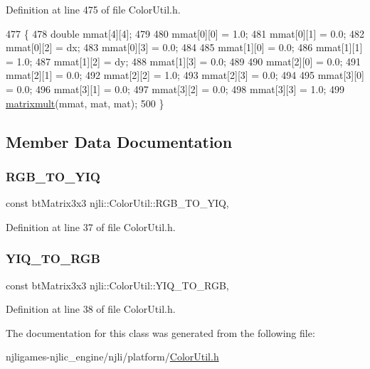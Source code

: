 Definition at line 475 of file Color\+Util.\+h.


\begin{DoxyCode}
477     \{
478       \textcolor{keywordtype}{double} mmat[4][4];
479 
480       mmat[0][0] = 1.0;
481       mmat[0][1] = 0.0;
482       mmat[0][2] = dx;
483       mmat[0][3] = 0.0;
484 
485       mmat[1][0] = 0.0;
486       mmat[1][1] = 1.0;
487       mmat[1][2] = dy;
488       mmat[1][3] = 0.0;
489 
490       mmat[2][0] = 0.0;
491       mmat[2][1] = 0.0;
492       mmat[2][2] = 1.0;
493       mmat[2][3] = 0.0;
494 
495       mmat[3][0] = 0.0;
496       mmat[3][1] = 0.0;
497       mmat[3][2] = 0.0;
498       mmat[3][3] = 1.0;
499       \mbox{\hyperlink{classnjli_1_1_color_util_a5cb3576c8177f303c88dc4e7283367c7}{matrixmult}}(mmat, mat, mat);
500     \}
\end{DoxyCode}


\subsection{Member Data Documentation}
\mbox{\label{classnjli_1_1_color_util_ae8aa4830ab0c084398eb830628323217}} 
\subsubsection{\texorpdfstring{R\+G\+B\+\_\+\+T\+O\+\_\+\+Y\+IQ}{RGB\_TO\_YIQ}}
{\footnotesize\ttfamily const bt\+Matrix3x3 njli\+::\+Color\+Util\+::\+R\+G\+B\+\_\+\+T\+O\+\_\+\+Y\+IQ\hspace{0.3cm}{\ttfamily [static]}, {\ttfamily [private]}}



Definition at line 37 of file Color\+Util.\+h.

\mbox{\label{classnjli_1_1_color_util_a9b3a5642a95a4cf7fbc782ac56acba4f}} 
\subsubsection{\texorpdfstring{Y\+I\+Q\+\_\+\+T\+O\+\_\+\+R\+GB}{YIQ\_TO\_RGB}}
{\footnotesize\ttfamily const bt\+Matrix3x3 njli\+::\+Color\+Util\+::\+Y\+I\+Q\+\_\+\+T\+O\+\_\+\+R\+GB\hspace{0.3cm}{\ttfamily [static]}, {\ttfamily [private]}}



Definition at line 38 of file Color\+Util.\+h.



The documentation for this class was generated from the following file\+:\begin{DoxyCompactItemize}
\item 
njligames-\/njlic\+\_\+engine/njli/platform/\mbox{\hyperlink{_color_util_8h}{Color\+Util.\+h}}\end{DoxyCompactItemize}
